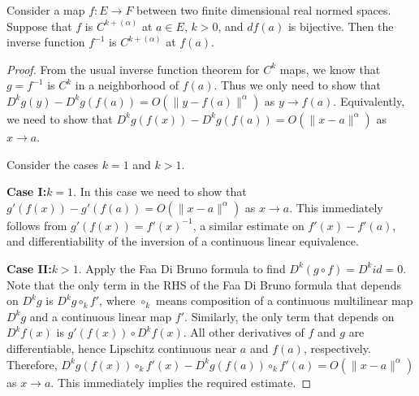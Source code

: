 \begin{theorem}%
  \label{thm:cdh-at-inverse}
  Consider a map \(f\colon E\to F\) between two finite dimensional real normed spaces.
  Suppose that \(f\) is \(C^{k+(\alpha)}\) at \(a \in E\), \(k > 0\), and \(df(a)\) is bijective.
  Then the inverse function \(f^{-1}\) is \(C^{k+(\alpha)}\) at \(f(a)\).
\end{theorem}
\begin{proof}
  From the usual inverse function theorem for \(C^{k}\) maps,
  we know that \(g=f^{-1}\) is \(C^{k}\) in a neighborhood of \(f(a)\).
  Thus we only need to show that \(D^{k}g(y)-D^{k}g(f(a)) = O\left(\|y - f(a)\|^{\alpha}\right)\) as \(y \to f(a)\).
  Equivalently, we need to show that \(D^{k}g(f(x)) - D^{k}g(f(a)) = O\left(\|x - a\|^{\alpha}\right)\) as \(x\to a\).

  Consider the cases \(k = 1\) and \(k > 1\).

  \textbf{Case I:\@\(k = 1\)}. In this case we need to show that
  \(g'(f(x)) - g'(f(a)) = O\left(\|x - a\|^{\alpha}\right)\) as \(x\to a\).
  This immediately follows from \(g'(f(x)) = {f'(x)}^{-1}\),
  a similar estimate on \(f'(x) - f'(a)\),
  and differentiability of the inversion of a continuous linear equivalence.

  \textbf{Case II:\@\(k > 1\)}.
  Apply the Faa Di Bruno formula to find \(D^{k}(g \circ f) = D^{k} id =0\).
  Note that the only term in the RHS of the Faa Di Bruno formula
  that depends on \(D^{k}g\) is \(D^{k}g\circ_{k} f'\),
  where \(\circ_{k}\) means composition of a continuous multilinear map \(D^{k}g\)
  and a continuous linear map \(f'\).
  Similarly, the only term that depends on \(D^{k}f(x)\) is \(g'(f(x))\circ D^{k}f(x)\).
  All other derivatives of \(f\) and \(g\) are differentiable,
  hence Lipschitz continuous near \(a\) and \(f(a)\), respectively.
  Therefore, \(D^{k}g(f(x))\circ_{k}f'(x) - D^{k}g(f(a))\circ_{k}f'(a)=O\left(\|x - a\|^{\alpha}\right)\) as \(x\to a\).
  This immediately implies the required estimate.
\end{proof}

